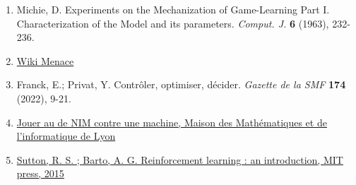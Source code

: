 \begin{enumerate}
\def\labelenumi{\arabic{enumi}.}
\tightlist
\item
  Michie, D. Experiments on the Mechanization of Game-Learning Part I.
  Characterization of the Model and its parameters. \emph{Comput. J.}
  \textbf{6} (1963), 232-236.
\item
  \href{https://en.wikipedia.org/wiki/Matchbox_Educable_Noughts_and_Crosses_Engine}{Wiki
  Menace}
\item
  Franck, E.; Privat, Y. Contrôler, optimiser, décider. \emph{Gazette de
  la SMF} \textbf{174} (2022), 9-21.
\item
  \href{https://mmi-lyon.fr/jouer-au-jeu-de-nim-contre-une-machine}{Jouer
  au de NIM contre une machine, Maison des Mathématiques et de
  l'informatique de Lyon}
\item
  \href{https://web.stanford.edu/class/psych209/Readings/SuttonBartoIPRLBook2ndEd.pdf}{Sutton,
  R. S. ; Barto, A. G. Reinforcement learning : an introduction, MIT
  press, 2015}
\end{enumerate}
